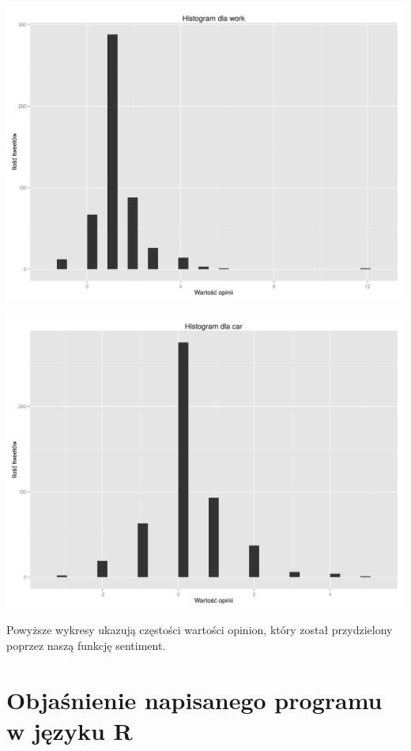 \documentclass[12pt,a4paper]{article}
\begin{document}
\begin{center}
\includegraphics[scale=0.35]{pictures/Histwork.png}
\end{center}

\begin{center}
\includegraphics[scale=0.35]{pictures/Histcar.png}
\end{center}

Powyższe wykresy ukazują częstości wartości opinion, który został przydzielony poprzez naszą funkcję sentiment. 

\section[Objaśnienie napisanego programu w języku R] {Objaśnienie napisanego programu w języku R}
\end{document}
